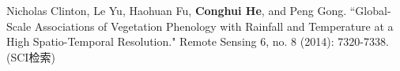\begin{resume}
\begin{publications}
    \item Nicholas Clinton, Le Yu, Haohuan Fu, \textbf{Conghui He}, and Peng Gong. ``Global-Scale Associations of Vegetation Phenology with Rainfall and Temperature at a High Spatio-Temporal Resolution." Remote Sensing 6, no. 8 (2014): 7320-7338. (SCI检索)
  \end{publications}


\end{resume}
